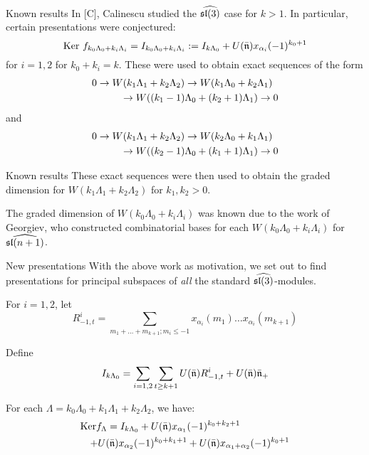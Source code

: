 \documentclass{beamer}
\begin{document}
\begin{frame}{Known results}
In [C], Calinescu studied the $\widehat{\frak{sl}(3)}$ case for $k > 1$. In particular, certain presentations were conjectured:
$$\mbox{Ker }f_{k_0\Lambda_0 + k_i\Lambda_i} = I_{k_0 \Lambda_0 + k_i \Lambda_i} := I_{k\Lambda_0} + U(\bar{\frak{n}})x_{\alpha_i}(-1)^{k_0+1}$$
for $ i =1,2$ for $k_0 + k_i = k$. 
\pause
These were used to obtain exact sequences of the form
\begin{eqnarray*}
\lefteqn{0 \rightarrow W(k_1\Lambda_1 + k_2\Lambda_2) \rightarrow W(k_1\Lambda_0 + k_2 \Lambda_1)}\\
&& \hspace{0.3in}\rightarrow W((k_1-1)\Lambda_0 + (k_2 + 1)\Lambda_1) \rightarrow 0
\end{eqnarray*}
and
\begin{eqnarray*}
\lefteqn{0 \rightarrow W(k_1\Lambda_1 + k_2\Lambda_2) \rightarrow W(k_2\Lambda_0 + k_1 \Lambda_1)}\\
&& \hspace{0.3in}\rightarrow W((k_2-1)\Lambda_0 + (k_1 + 1)\Lambda_1) \rightarrow 0
\end{eqnarray*}

\end{frame}

\begin{frame}{Known results}
These exact sequences were then used to obtain the graded dimension for $W(k_1\Lambda_1 + k_2 \Lambda_2)$ for $k_1,k_2 > 0$. \\
\vspace{0.2in}

The graded dimension of $W(k_0\Lambda_0 + k_i \Lambda_i)$ was known due to the work of Georgiev, who constructed combinatorial bases for each $W(k_0\Lambda_0 + k_i \Lambda_i)$ for $\widehat{\frak{sl}(n+1)}$.

\end{frame}

\begin{frame}{New presentations}
With the above work as motivation, we set out to find presentations for principal subspaces of {\em all} the standard $\widehat{\frak{sl}(3)}$-modules.\\
\pause

For $i=1,2$, let 
$$R_{-1,t}^i = \sum_{m_1 + \dots + m_{k+1}; m_i \le -1}x_{\alpha_i}(m_1) \dots x_{\alpha_i}(m_{k+1})$$

Define
$$I_{k\Lambda_0} = \sum_{i=1,2}\sum_{t \ge k+1} U(\bar{\frak{n}}) R_{-1,t}^i + U(\bar{\frak{n}})\bar{\frak{n}}_+$$
\pause

\begin{theorem}
For each $\Lambda = k_0\Lambda_0 + k_1\Lambda_1 + k_2\Lambda_2$, we have: 
\begin{eqnarray*}
\lefteqn{\mbox{Ker}f_\Lambda = I_{k\Lambda_0} +  U(\bar{\frak{n}})x_{\alpha_1}(-1)^{k_0+k_2+1}}\\  && + U(\bar{\frak{n}})x_{\alpha_2}(-1)^{k_0+k_1+1} + U(\bar{\frak{n}})x_{\alpha_1 + \alpha_2}(-1)^{k_0+1}
\end{eqnarray*}
\end{theorem}
\end{frame}
\end{document}
